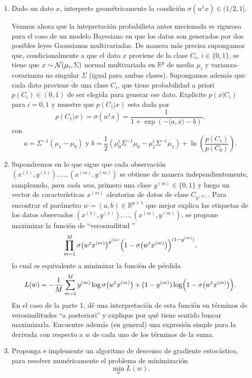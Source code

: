 \begin{enumerate}
\item  Dado un dato $x$,  interprete geom\'etricamente la condici\'on $\sigma(w^\mathrm{t}x)\in (1/2,1]$. 

  Veamos  ahora que la intepretaci\'on probabilista antes mecionada es rigurosa para el caso de un modelo Bayesiano  en que los datos son generados por dos posibles leyes Gaussianas multivariadas. De manera m\'as precisa supongamos que, condicionalmente a que el dato $x$ proviene de la clase  $C_i$, $i\in\{0,1\}$, se tiene que $  x\sim {\cal N}( \mu_i , \Sigma)$ normal multivariada en $\mathbb{R}^p$ de media $\mu_i$ y  varianza-covarianza no singular $\Sigma$ (igual para ambas clases).  Supongamos adem\'as que cada dato proviene de una clase $C_i$, que tiene probabilidad a priori $p(C_i)\in (0,1)$ de ser elegida para generar ese dato.  Explicite $p(x\vert C_i)$  para $i=0,1$ y muestre que $p(C_1\vert x)$ esta dada por
  \[ p(C_1\vert x)=  \sigma (w^\mathrm{t}x )= \frac{1}{1+ \exp{(-\langle a, x\rangle - b)}}, \]
  con
  \[ a= \Sigma^{-1}(\mu_1-\mu_0)\mbox{ y } b= \frac{1}{2} (\mu_0^\mathrm{t}  \Sigma^{-1} \mu_0 - \mu_1^\mathrm{t}  \Sigma^{-1} \mu_1)+ \ln\left(\frac{p(C_1)}{p(C_0)}\right).\]
 

  \item Supondremos en lo que sigue  que cada observación $(x^{(1)},y^{(1)}),\dots,(x^{(m)},y^{(m)})$ se obtiene de manera independientemente, sampleando,  {\it para cada una}, primero una clase $y^{(m)}\in \{0,1\}$ y luego un vector de caracter\'isticas $x^{(m)}$ aleatorias de datos de clase $C_{y^{(m)}}$. 
  Para encontrar el parámetro $w = (a,b)\in \mathbb{R}^{p+1} $ que mejor explica las etiquetas de los datos observados $(x^{(1)},y^{(1)}),\dots,(x^{(m)},y^{(m)})$, se propone maximizar la función de ``verosimilitud '' 
  \[ \prod_{m=1}^M \sigma\bigl( w^\mathrm{t}x^{(m)} \bigr)^{y^{(m)}} \Bigl( 1 - \sigma\bigl( w^\mathrm{t}x^{(m)}\bigr) \Bigr)^{(1-y^{(m)})}, \]
  lo cual es equivalente a minimizar la función de pérdida
  \begin{equation}\label{LogLike}
     L(w) = -\frac{1}{M}\sum_{m=1}^My^{(m)}\log \sigma\bigl(w^\mathrm{t}x^{(m)}\bigr) + (1-y^{(m)})\log\Bigl(1-\sigma\bigl(w^\mathrm{t}x^{(m)}\bigr)\Bigr). 
   \end{equation}
   En el caso de la parte 1, d\'e una interpretaci\'on de  esta funci\'on en t\'erminos de verosimilitudes ``a posteriori'' y explique por qu\'e tiene sentido buscar maximizarla.   Encuentre adem\'as (en general) una expresi\'on simple para la derivada con respecto a $w$ de cada uno de los t\'erminos de la suma.  
   \item Proponga e implemente un algoritmo de descenso de gradiente estocástico,  para resolver numéricamente el problema de minimización
    \[ \min_w L(w).\]
                

\end{enumerate}
